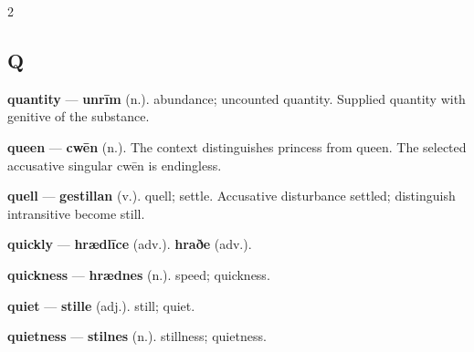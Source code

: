 \begin{multicols}{2}
\subsection*{Q}
\textbf{quantity} — \textbf{unrīm} (n.). abundance; uncounted quantity. Supplied quantity with genitive of the substance.\par
\textbf{queen} — \textbf{cwēn} (n.). The context distinguishes princess from queen. The selected accusative singular cwēn is endingless.\par
\textbf{quell} — \textbf{gestillan} (v.). quell; settle. Accusative disturbance settled; distinguish intransitive become still.\par
\textbf{quickly} — \textbf{hrædlīce} (adv.).  \textbf{hraðe} (adv.).\par
\textbf{quickness} — \textbf{hrædnes} (n.). speed; quickness.\par
\textbf{quiet} — \textbf{stille} (adj.). still; quiet.\par
\textbf{quietness} — \textbf{stilnes} (n.). stillness; quietness.\par

\end{multicols}
